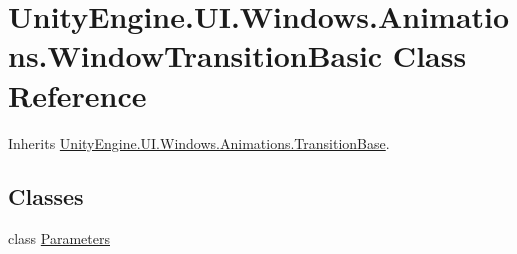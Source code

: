 \hypertarget{class_unity_engine_1_1_u_i_1_1_windows_1_1_animations_1_1_window_transition_basic}{}\section{Unity\+Engine.\+U\+I.\+Windows.\+Animations.\+Window\+Transition\+Basic Class Reference}
\label{class_unity_engine_1_1_u_i_1_1_windows_1_1_animations_1_1_window_transition_basic}


Inherits \hyperlink{class_unity_engine_1_1_u_i_1_1_windows_1_1_animations_1_1_transition_base}{Unity\+Engine.\+U\+I.\+Windows.\+Animations.\+Transition\+Base}.

\subsection*{Classes}
\begin{DoxyCompactItemize}
\item 
class \hyperlink{class_unity_engine_1_1_u_i_1_1_windows_1_1_animations_1_1_window_transition_basic_1_1_parameters}{Parameters}
\end{DoxyCompactItemize}
